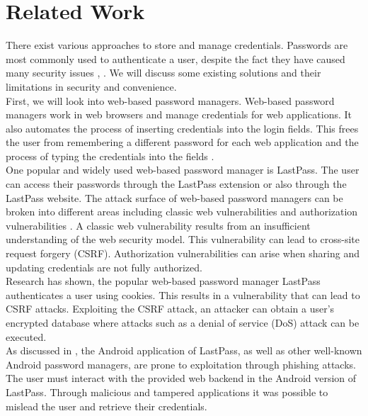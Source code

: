 \section{Related Work} \label{relwork}

There exist various approaches to store and manage credentials. Passwords are most commonly used to authenticate a user, despite the fact they have caused many security issues \cite{JacommeK18}, \cite{WeakPasswords}. We will discuss some existing solutions and their limitations in security and convenience. \\

First, we will look into web-based password managers. Web-based password managers work in web browsers and manage credentials for web applications. It also automates the process of inserting credentials into the login fields. This frees the user from remembering a different password for each web application and the process of typing the credentials into the fields \cite{LiHAS14}. \\
One popular and widely used web-based password manager is LastPass. The user can access their passwords through the LastPass extension or also through the LastPass website. The attack surface of web-based password managers can be broken into different areas including classic web vulnerabilities and authorization vulnerabilities \cite{LiHAS14}. A classic web vulnerability results from an insufficient understanding of the web security model. This vulnerability can lead to cross-site request forgery (CSRF). Authorization vulnerabilities can arise when sharing and updating credentials are not fully authorized. \\
Research \cite{LiHAS14} has shown, the popular web-based password manager LastPass authenticates a user using cookies. This results in a vulnerability that can lead to CSRF attacks. Exploiting the CSRF attack, an attacker can obtain a user's encrypted database where attacks such as a denial of service (DoS) attack can be executed. \\
As discussed in \cite{AndroidPhishing}, the Android application of LastPass, as well as other well-known Android password managers, are prone to exploitation through phishing attacks. The user must interact with the provided web backend in the Android version of LastPass. Through malicious and tampered applications it was possible to mislead the user and retrieve their credentials. \\

